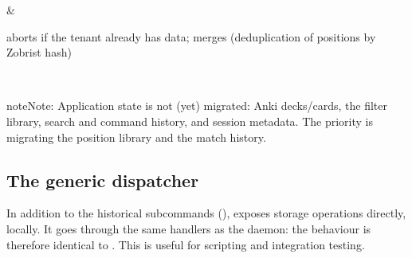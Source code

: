 \documentclass[letterpaper,10pt,english]{sphinxmanual}
\begin{document}
\begin{savenotes}
\begin{tabular}[t]{}
\begin{varwidth}[t]{}
\sphinxbeforeendvarwidth
\end{varwidth}%
&\begin{varwidth}[t]{}
\sphinxAtStartPar
{} aborts if the tenant already has data;  merges (deduplication of positions by Zobrist hash)
\sphinxbeforeendvarwidth
\end{varwidth}%
\\
\sphinxbottomrule
\end{tabular}
\sphinxtableafterendhook\par
\sphinxattableend\end{savenotes}

\begin{sphinxadmonition}{note}{Note:}
\sphinxAtStartPar
Application state is not (yet) migrated: Anki decks/cards, the filter library, search and command history, and session metadata. The priority is migrating the position library and the match history.
\end{sphinxadmonition}


\subsection{The generic  dispatcher}
\label{\detokenize{mode_headless:le-dispatcher-generique-call}}\label{\detokenize{mode_headless:headless-call}}
\sphinxAtStartPar
In addition to the historical subcommands ({\hyperref[\detokenize{cli:cli}]{}}),  exposes  storage operations directly, locally. It goes through the same handlers as the  daemon: the behaviour is therefore identical to . This is useful for scripting and integration testing.
\end{document}
